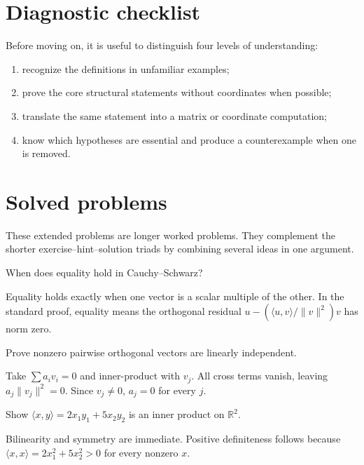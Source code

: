 \section{Diagnostic checklist}
Before moving on, it is useful to distinguish four levels of understanding:
\begin{enumerate}
\item recognize the definitions in unfamiliar examples;
\item prove the core structural statements without coordinates when possible;
\item translate the same statement into a matrix or coordinate computation;
\item know which hypotheses are essential and produce a counterexample when one is removed.
\end{enumerate}

\section{Solved problems}
These extended problems are longer worked problems. They complement the shorter exercise--hint--solution triads by combining several ideas in one argument.

\begin{problem}\label{prob:i13-problem-01}
When does equality hold in Cauchy–Schwarz?
\end{problem}
\begin{solution}
Equality holds exactly when one vector is a scalar multiple of the other. In the standard proof, equality means the orthogonal residual $u-(\langle u,v\rangle/\|v\|^2)v$ has norm zero.
\end{solution}

\begin{problem}\label{prob:i13-problem-02}
Prove nonzero pairwise orthogonal vectors are linearly independent.
\end{problem}
\begin{solution}
Take $\sum a_iv_i=0$ and inner-product with $v_j$. All cross terms vanish, leaving $a_j\|v_j\|^2=0$. Since $v_j\ne0$, $a_j=0$ for every $j$.
\end{solution}

\begin{problem}\label{prob:i13-problem-03}
Show $\langle x,y\rangle=2x_1y_1+5x_2y_2$ is an inner product on $\mathbb R^2$.
\end{problem}
\begin{solution}
Bilinearity and symmetry are immediate. Positive definiteness follows because $\langle x,x\rangle=2x_1^2+5x_2^2>0$ for every nonzero $x$.
\end{solution}

